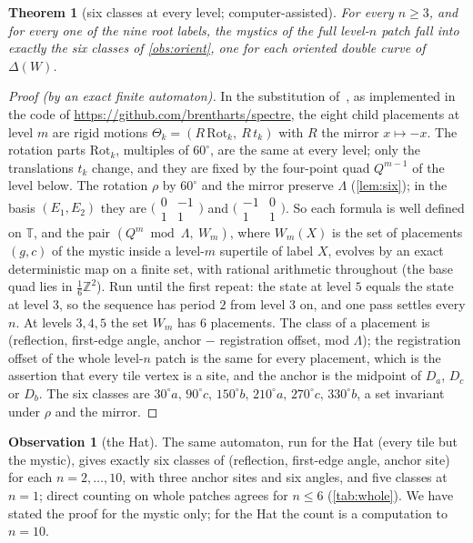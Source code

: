 \documentclass[11pt,a4paper]{article}
\newcommand{\ZZ}{\mathbb{Z}}
\newcommand{\TT}{\mathbb{T}}
\newcommand{\Lam}{\Lambda}
\theoremstyle{plain}
\newtheorem{theorem}{Theorem}
\theoremstyle{definition}
\newtheorem{observation}{Observation}
\begin{document}
\begin{theorem}[six classes at every level; computer-assisted]
\label{thm:six}
For every $n\ge3$, and for every one of the nine root labels, the mystics of the full
level-$n$ patch fall into exactly the six classes of \cref{obs:orient}, one for each
oriented double curve of $\Delta(W)$.
\end{theorem}
\begin{proof}[Proof (by an exact finite automaton)]
In the substitution of~\cite{SmithHat}, as implemented in the code of
\url{https://github.com/brentharts/spectre}, the eight child placements at level $m$
are rigid motions $\Theta_k=(R\,\mathrm{Rot}_k,\ R\,t_k)$ with $R$ the mirror
$x\mapsto-x$. The rotation parts $\mathrm{Rot}_k$, multiples of $60^\circ$, are the same
at every level; only the translations $t_k$ change, and they are fixed by the four-point
quad $Q^{m-1}$ of the level below. The rotation $\rho$ by $60^\circ$ and the mirror
preserve $\Lam$ (\cref{lem:six}); in the basis $(E_1,E_2)$ they are
$\bigl(\begin{smallmatrix}0&-1\\1&1\end{smallmatrix}\bigr)$ and
$\bigl(\begin{smallmatrix}-1&0\\1&1\end{smallmatrix}\bigr)$. So each formula is
well defined on $\TT$, and the pair $(Q^m\bmod\Lam,\ W_m)$, where $W_m(X)$ is the set of
placements $(g,c)$ of the mystic inside a level-$m$ supertile of label $X$,
evolves by an exact deterministic map on a finite set, with rational arithmetic
throughout (the base quad lies in $\tfrac16\ZZ^2$). Run until the first repeat: the state
at level $5$ equals the state at level $3$, so the sequence has period $2$ from
level $3$ on, and one pass settles every $n$. At levels $3,4,5$ the set $W_m$ has $6$
placements. The class of a placement is (reflection, first-edge angle, anchor
$-$ registration offset, mod $\Lam$); the registration offset of the whole level-$n$
patch is the same for every placement, which is the assertion that every tile vertex is
a site, and the anchor is the midpoint of $D_a$, $D_c$ or $D_b$. The six classes are
$30^\circ a,\,90^\circ c,\,150^\circ b,\,210^\circ a,\,270^\circ c,\,330^\circ b$, a set
invariant under $\rho$ and the mirror.
\end{proof}
\begin{observation}[the Hat]
\label{obs:hatsix}
The same automaton, run for the Hat (every tile but the mystic), gives exactly six
classes of (reflection, first-edge angle, anchor site) for each $n=2,\dots,10$, with
three anchor sites and six angles, and five classes at $n=1$; direct counting on whole
patches agrees for $n\le6$ (\cref{tab:whole}).
We have stated the proof for the mystic only; for the Hat the count is a computation to
$n=10$.
\end{observation}
\end{document}
